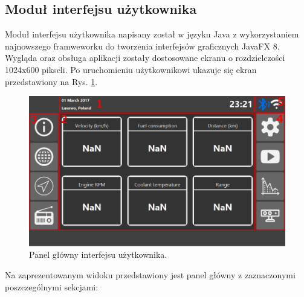 \documentclass[12pt, twoside]{article} %
\numberwithin{equation}{subsection}
\numberwithin{figure}{section}
\numberwithin{table}{section}
\begin{document}
		
	
	\newpage
	
	
\subsection{Moduł interfejsu użytkownika}\label{rozdzial_hmi_software}
	\hspace{0.5cm}Moduł interfejsu użytkownika napisany został w języku Java z wykorzystaniem najnowszego framweworku do tworzenia interfejsów graficznych JavaFX 8. Wygląda oraz obsługa aplikacji zostały dostosowane ekranu o rozdzielczości 1024x600 pikseli. Po uruchomieniu użytkownikowi ukazuje się ekran przedstawiony na Rys. \ref{user_interface_dashboard}.
	
		\begin{figure}[!h]
			\centering
			\includegraphics[scale=0.44]{Images/user_interface_dashboard.png}
			\caption{Panel główny interfejsu użytkownika.}
			\label{user_interface_dashboard}
		\end{figure}
		
		Na zaprezentowanym widoku przedstawiony jest panel główny z zaznaczonymi poszczególnymi sekcjami:
		
\end{document}

